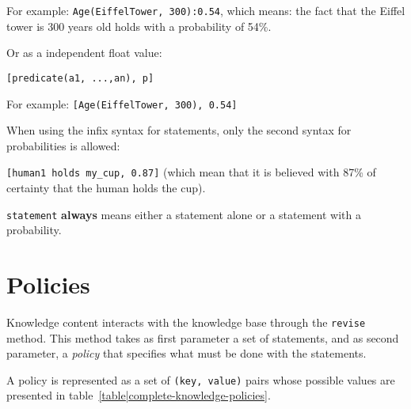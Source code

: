 For example: {\tt Age(EiffelTower, 300):0.54}, which means: the fact that the
Eiffel tower is 300 years old holds with a probability of 54\%.

Or as a independent float value:

\begin{center} \tt [predicate(a1, ...,an), p] \end{center}

For example: \texttt{[Age(EiffelTower, 300), 0.54]}

When using the infix syntax for statements, only the second syntax for
probabilities is allowed:

\texttt{[human1 holds my\_cup, 0.87]} (which mean that it is believed with 87\%
of certainty that the human holds the cup).

\texttt{statement} \textbf{always} means either a statement alone or a
statement with a probability.


% 
% 
% 
% 
% 
% 
% 
\section{Policies}
\label{sect|kbapi-policies}

Knowledge content interacts with the knowledge base through the \texttt{revise}
method. This method takes as first parameter a set of statements, and as second
parameter, a \emph{policy} that specifies what must be done with the
statements.

A policy is represented as a set of \texttt{(key, value)} pairs whose possible
values are presented in table~\ref{table|complete-knowledge-policies}.

